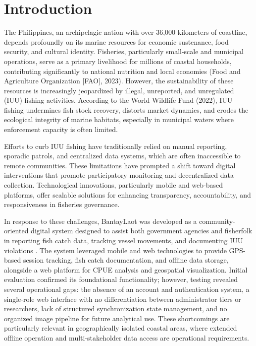 \documentclass[journal]{IEEEtran}
\begin{document}
\IEEEpeerreviewmaketitle


\section{Introduction}

The Philippines, an archipelagic nation with over 36,000 kilometers of coastline, depends profoundly on its marine resources for economic sustenance, food security, and cultural identity. Fisheries, particularly small-scale and municipal operations, serve as a primary livelihood for millions of coastal households, contributing significantly to national nutrition and local economies (Food and Agriculture Organization [FAO], 2023). However, the sustainability of these resources is increasingly jeopardized by illegal, unreported, and unregulated (IUU) fishing activities. According to the World Wildlife Fund (2022), IUU fishing undermines fish stock recovery, distorts market dynamics, and erodes the ecological integrity of marine habitats, especially in municipal waters where enforcement capacity is often limited.

Efforts to curb IUU fishing have traditionally relied on manual reporting, sporadic patrols, and centralized data systems, which are often inaccessible to remote communities. These limitations have prompted a shift toward digital interventions that promote participatory monitoring and decentralized data collection. Technological innovations, particularly mobile and web-based platforms, offer scalable solutions for enhancing transparency, accountability, and responsiveness in fisheries governance.

In response to these challenges, BantayLaot was developed as a community-oriented digital system designed to assist both government agencies and fisherfolk in reporting fish catch data, tracking vessel movements, and documenting IUU violations \cite{Gallero2025}. The system leveraged mobile and web technologies to provide GPS-based session tracking, fish catch documentation, and offline data storage, alongside a web platform for CPUE analysis and geospatial visualization. Initial evaluation confirmed its foundational functionality; however, testing revealed several operational gaps: the absence of an account and authentication system, a single-role web interface with no differentiation between administrator tiers or researchers, lack of structured synchronization state management, and no organized image pipeline for future analytical use. These shortcomings are particularly relevant in geographically isolated coastal areas, where extended offline operation and multi-stakeholder data access are operational requirements.
\end{document}

